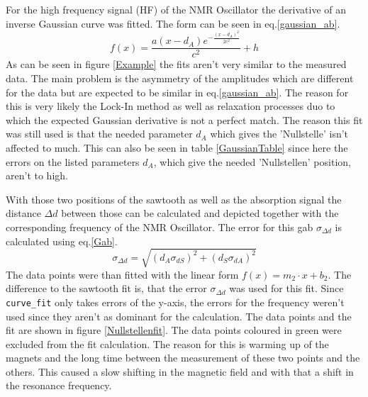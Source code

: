 For the high frequency signal (HF) of the NMR Oscillator the derivative of an inverse Gaussian curve was fitted. The form can be seen in eq.\ref{gaussian_ab}.
\begin{equation}
	f(x)=\frac{a(x-d_{A})e^{-\frac{(x-d_{A})^2}{2c^2}}}{c^2}+h
	\label{gaussian_ab}
\end{equation}
As can be seen in figure \ref{Example} the fits aren't very similar to the measured data. The main problem is the asymmetry of the amplitudes which are different for the data but are expected to be similar in eq.\ref{gaussian_ab}. The reason for this is very likely the Lock-In method as well as relaxation processes duo to which the expected Gaussian derivative is not a perfect match. The reason this fit was still used is that the needed parameter $d_{A}$ which gives the 'Nullstelle' isn't affected to much. This can also be seen in table \ref{GaussianTable} since here the errors on the listed parameters $d_A$, which give the needed 'Nullstellen' position, aren't to high.\par
With those two positions of the sawtooth as well as the absorption signal the distance $\Delta d$ between those can be calculated and depicted together with the corresponding frequency of the NMR Oscillator. The error for this gab $\sigma_{\Delta d}$ is calculated using eq.\ref{Gab}. 
\begin{equation}
	\sigma_{\Delta d}=\sqrt{(d_A\sigma_{dS})^2+(d_S\sigma_{dA})^2}
	\label{Gab}
\end{equation}
The data points were than fitted with the linear form $f(x)=m_2\cdot x+b_2$. The difference to the sawtooth fit is, that the error $\sigma_{\Delta d}$ was used for this fit. Since \verb|curve_fit| only takes errors of the y-axis, the errors for the frequency weren't used since they aren't as dominant for the calculation. The data points and the fit are shown in figure \ref{Nullstellenfit}. The data points coloured in green were excluded from the fit calculation. The reason for this is warming up of the magnets and the long time between the measurement of these two points and the others. This caused a slow shifting in the magnetic field and with that a shift in the resonance frequency.\par
